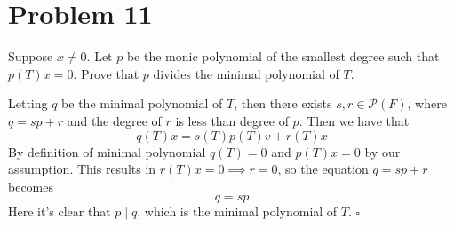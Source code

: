 \documentclass[12pt]{article}
\newenvironment{proof}{\noindent{\bf Proof.}}{\hfill $\square$\medskip}
\begin{document}
\newpage
\section{Problem 11}
Suppose $x\neq 0$. Let $p$ be the monic polynomial of the smallest degree such that $p(T)x=0$. Prove that $p$ divides the minimal polynomial of $T$.

\begin{proof}
    Letting $q$ be the minimal polynomial of $T$, then there exists $s,r\in \mathcal{P}(F)$, where $q=sp+r$ and the degree of $r$ is less than degree of $p$. Then we have that
    $$q(T)x=s(T)p(T)v+r(T)x$$
    By definition of minimal polynomial $q(T)=0$ and $p(T)x=0$ by our assumption. This results in $r(T)x=0\implies r=0$, so the equation $q=sp+r$ becomes
    $$q=sp$$
    Here it's clear that $p\mid q$, which is the minimal polynomial of $T$.
\end{proof}
\end{document}
